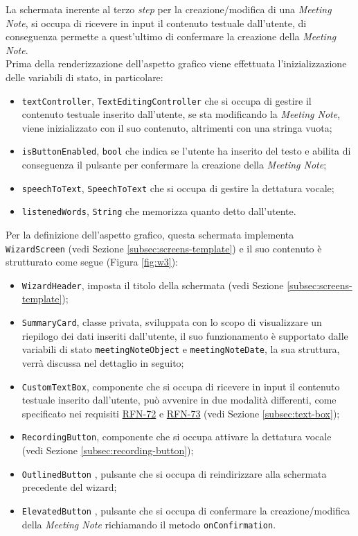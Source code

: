 La schermata inerente al terzo \emph{step} per la creazione/modifica di una \emph{Meeting Note}, si occupa di ricevere in input il contenuto testuale dall'utente, di conseguenza permette a quest'ultimo di confermare la creazione della \emph{Meeting Note}. \\
Prima della renderizzazione dell'aspetto grafico viene effettuata l'inizializzazione delle variabili di stato, in particolare:
\begin{itemize}
    \item \lstinline{textController}, \lstinline{TextEditingController} che si occupa di gestire il contenuto testuale inserito dall'utente, se sta modificando la \emph{Meeting Note}, viene inizializzato con il suo contenuto, altrimenti con una stringa vuota;
    \item \lstinline{isButtonEnabled}, \lstinline{bool} che indica se l'utente ha inserito del testo e abilita di conseguenza il pulsante per confermare la creazione della \emph{Meeting Note};
    \item \lstinline{speechToText}, \lstinline{SpeechToText} che si occupa di gestire la dettatura vocale;
    \item \lstinline{listenedWords}, \lstinline{String} che memorizza quanto detto dall'utente.
\end{itemize}
Per la definizione dell'aspetto grafico, questa schermata implementa \lstinline{WizardScreen} (vedi Sezione \ref{subsec:screens-template}) e il suo contenuto è strutturato come segue (Figura \ref{fig:w3}):
\begin{itemize}
    \item \lstinline{WizardHeader}, imposta il titolo della schermata (vedi Sezione \ref{subsec:screens-template});
    \item \lstinline{SummaryCard}, classe privata, sviluppata con lo scopo di visualizzare un riepilogo dei dati inseriti dall'utente, il suo funzionamento è supportato dalle variabili di stato \lstinline{meetingNoteObject} e \lstinline{meetingNoteDate}, la sua struttura, verrà discussa nel dettaglio in seguito;
    \item \lstinline{CustomTextBox}, componente che si occupa di ricevere in input il contenuto testuale inserito dall'utente, può avvenire in due modalità differenti, come specificato nei requisiti \hyperref[RFN-72]{RFN-72} e \hyperref[RFN-73]{RFN-73} (vedi Sezione \ref{subsec:text-box});
    \item \lstinline{RecordingButton}, componente che si occupa attivare la dettatura vocale (vedi Sezione \ref{subsec:recording-button});
    \item \lstinline{OutlinedButton} \cite{site:outline-button}, pulsante che si occupa di reindirizzare alla schermata precedente del \gls{wizard}\glsoccur;
    \item \lstinline{ElevatedButton} \cite{site:elevated-button}, pulsante che si occupa di confermare la creazione/modifica della \emph{Meeting Note} richiamando il metodo \lstinline{onConfirmation}.
\end{itemize}
